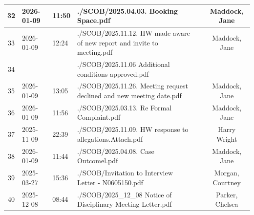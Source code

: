 \begin{landscape}
\begin{tabularx}{\linewidth}{|c|l|l|X|c|c|}
		32                               & 2026-01-09          & 11:50          & ./SCOB/2025.04.03. Booking Space.pdf                                                                                   &                         & Maddock, Jane            \\ \hline
		33                               & 2026-01-09          & 12:24          & ./SCOB/2025.11.12. HW made aware of new report and invite to meeting.pdf                                               &                         & Maddock, Jane            \\ \hline
		34                               &                     &                & ./SCOB/2025.11.06 Additional conditions approved.pdf                                                                   &                         &                          \\ \hline
		35                               & 2026-01-09          & 13:05          & ./SCOB/2025.11.26. Meeting request declined and new meeting date.pdf                                                   &                         & Maddock, Jane            \\ \hline
		36                               & 2026-01-09          & 11:56          & ./SCOB/2025.03.13. Re Formal Complaint.pdf                                                                             &                         & Maddock, Jane            \\ \hline
		37                               & 2025-11-09          & 22:39          & ./SCOB/2025.11.09. HW response to allegations.Attach.pdf                                                               &                         & Harry Wright             \\ \hline
		38                               & 2026-01-09          & 11:44          & ./SCOB/2025.04.08. Case Outcomel.pdf                                                                                   &                         & Maddock, Jane            \\ \hline
		39                               & 2025-03-27          & 15:36          & ./SCOB/Invitation to Interview Letter - N0605150.pdf                                                                   &                         & Morgan, Courtney         \\ \hline
		40                               & 2025-12-08          & 08:44          & ./SCOB/2025\_12\_08 Notice of Disciplinary Meeting Letter.pdf                                                          &                         & Parker, Chelsea          \\ \hline

\end{tabularx}
\end{landscape}
